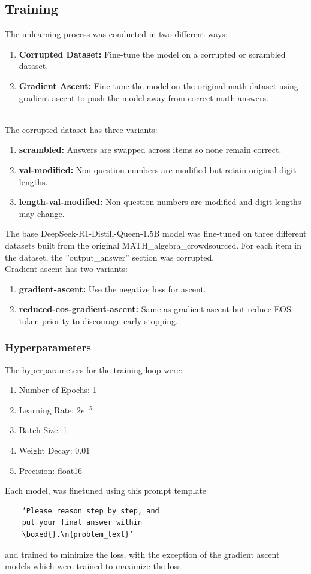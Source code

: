 \documentclass[10.5pt]{article}
\begin{document}
\subsection{Training}
The unlearning process was conducted in two different ways:
\begin{enumerate}
    \item \textbf{Corrupted Dataset:} Fine-tune the model on a corrupted or scrambled dataset.
    \item \textbf{Gradient Ascent:} Fine-tune the model on the original math dataset using gradient ascent to push the model away from correct math answers.
\end{enumerate}
\\
The corrupted dataset has three variants:
\begin{enumerate}
    \item \textbf{scrambled:} Answers are swapped across items so none remain correct.
    \item \textbf{val-modified:} Non-question numbers are modified but retain original digit lengths.
    \item \textbf{length-val-modified:} Non-question numbers are modified and digit lengths may change.
\end{enumerate}
The base DeepSeek-R1-Distill-Queen-1.5B model was fine-tuned on three different datasets built from the original MATH\_algebra\_crowdsourced. For each item in the dataset, the ''output\_answer'' section was corrupted.
\\
Gradient ascent has two variants:
\begin{enumerate}
    \item \textbf{gradient-ascent:} Use the negative loss for ascent.
    \item \textbf{reduced-eos-gradient-ascent:} Same as gradient-ascent but reduce EOS token priority to discourage early stopping.
\end{enumerate}
\subsubsection{Hyperparameters}
The hyperparameters for the training loop were:
\begin{enumerate}
    \item Number of Epochs: 1
    \item Learning Rate: $2e^{-5}$
    \item Batch Size: 1
    \item Weight Decay: 0.01
    \item Precision: float16
\end{enumerate}
Each model, was finetuned using this prompt template\begin{verbatim}
    ‘Please reason step by step, and 
    put your final answer within 
    \boxed{}.\n{problem_text}’
\end{verbatim} 
and trained to minimize the loss, with the exception of the gradient ascent models which were trained to maximize the loss.
\end{document}
